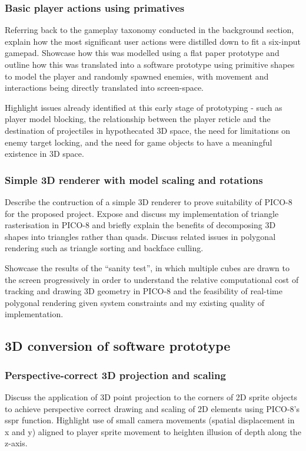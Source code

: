 \documentclass{article}
\begin{document}
\subsubsection*{Basic player actions using primatives}
Referring back to the gameplay taxonomy conducted in the background section, explain
how the most significant user actions were distilled down to fit a six-input
gamepad. Showcase how this was modelled using a flat paper prototype and outline
how this was translated into a software prototype using primitive shapes to model
the player and randomly spawned enemies, with movement and interactions being
directly translated into screen-space.

Highlight issues already identified at this early stage of prototyping - such as
player model blocking, the relationship between the player reticle and the destination
of projectiles in hypothecated 3D space, the need for limitations on enemy
target locking, and the need for game objects to have a meaningful existence in 3D
space.
\subsubsection*{Simple 3D renderer with model scaling and rotations}
Describe the contruction of a simple 3D renderer to prove suitability of PICO-8 for
the proposed project. Expose and discuss my implementation of triangle rasterisation
in PICO-8 and briefly explain the benefits of decomposing 3D shapes into triangles
rather than quads. Discuss related issues in polygonal rendering such as triangle
sorting and backface culling.

Showcase the results of the ``sanity test'', in which multiple
cubes are drawn to the screen progressively in order to understand the relative
computational cost of tracking and drawing 3D geometry in PICO-8 and the feasibility
of real-time polygonal rendering given system constraints and my existing quality
of implementation.

\subsection{3D conversion of software prototype}
\subsubsection*{Perspective-correct 3D projection and scaling}
Discuss the application of 3D point projection to the corners of 2D sprite objects
to achieve perspective correct drawing and scaling of 2D elements using PICO-8's sspr
function. Highlight use of small camera movements (spatial displacement in x and y)
aligned to player sprite movement to heighten illusion of depth along the z-axis.
\end{document}
